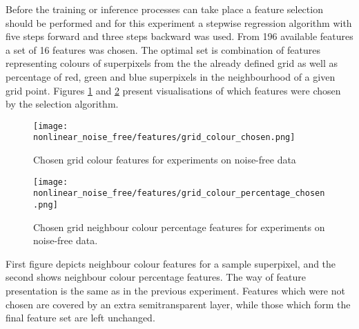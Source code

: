 Before the training or inference processes can take place a feature selection should be performed and for this experiment a stepwise regression algorithm with five steps forward and three steps backward was used. From 196 available features a set of 16 features was chosen. The optimal set is combination of features representing colours of superpixels from the the already defined grid as well as percentage of red, green and blue superpixels in the neighbourhood of a given grid point. Figures \ref{fig:nonlinear_noise_free_features_colour} and \ref{fig:nonlinear_noise_free_features_percentage} present visualisations of which features were chosen by the selection algorithm.
\begin{figure}[ht]
    \centering
    \texttt{[image: nonlinear\_noise\_free/features/grid\_colour\_chosen.png]}
    \caption{Chosen grid colour features for experiments on noise-free data}
    \label{fig:nonlinear_noise_free_features_colour}
\end{figure}
\begin{figure}[ht]
    \centering
    \texttt{[image: nonlinear\_noise\_free/features/grid\_colour\_percentage\_chosen.png]}
    \caption{Chosen grid neighbour colour percentage features for experiments on noise-free data.}
    \label{fig:nonlinear_noise_free_features_percentage}
\end{figure}

First figure depicts neighbour colour features for a sample superpixel, and the second shows neighbour colour percentage features. The way of feature presentation is the same as in the previous experiment. Features which were not chosen are covered by an extra semitransparent layer, while those which form the final feature set are left unchanged.

